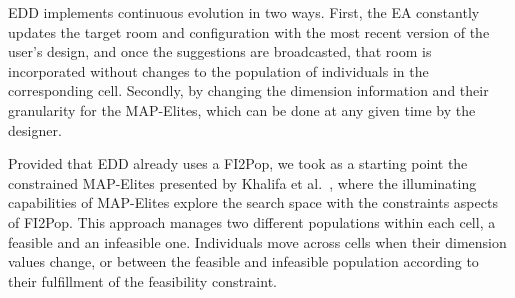 \documentclass[conference]{IEEEtran}
\begin{document}


EDD implements continuous evolution in two ways. First, the EA constantly updates the target room and configuration with the most recent version of the user’s design, and once the suggestions are broadcasted, that room is incorporated without changes to the population of individuals in the corresponding cell. Secondly, by changing the dimension information and their granularity for the MAP-Elites, which can be done at any given time by the designer. %

Provided that EDD already uses a FI2Pop, we took as a starting point the constrained MAP-Elites presented by Khalifa et al.~\cite{Khalifa2018}, where the illuminating capabilities of MAP-Elites explore the search space with the constraints aspects of FI2Pop. This approach manages two different populations within each cell, a feasible and an infeasible one. Individuals move across cells when their dimension values change, or between the feasible and infeasible population according to their fulfillment of the feasibility constraint.


\end{document}
